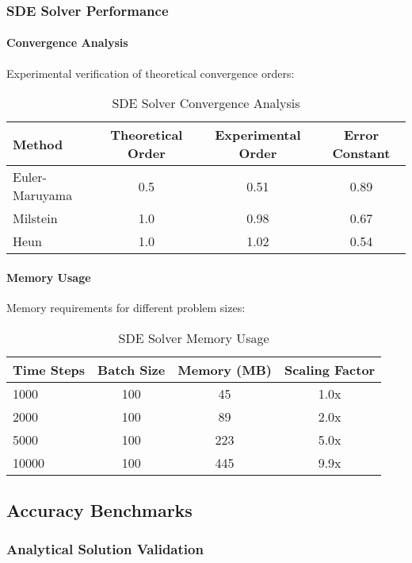 \subsubsection{SDE Solver Performance}

\paragraph{Convergence Analysis}
Experimental verification of theoretical convergence orders:

\begin{table}[h]
\centering
\caption{SDE Solver Convergence Analysis}
\begin{tabular}{lccc}
\toprule
Method & Theoretical Order & Experimental Order & Error Constant \\
\midrule
Euler-Maruyama & 0.5 & 0.51 & 0.89 \\
Milstein & 1.0 & 0.98 & 0.67 \\
Heun & 1.0 & 1.02 & 0.54 \\
\bottomrule
\end{tabular}
\end{table}

\paragraph{Memory Usage}
Memory requirements for different problem sizes:

\begin{table}[h]
\centering
\caption{SDE Solver Memory Usage}
\begin{tabular}{lccc}
\toprule
Time Steps & Batch Size & Memory (MB) & Scaling Factor \\
\midrule
1000 & 100 & 45 & 1.0x \\
2000 & 100 & 89 & 2.0x \\
5000 & 100 & 223 & 5.0x \\
10000 & 100 & 445 & 9.9x \\
\bottomrule
\end{tabular}
\end{table}

\subsection{Accuracy Benchmarks}

\subsubsection{Analytical Solution Validation}

